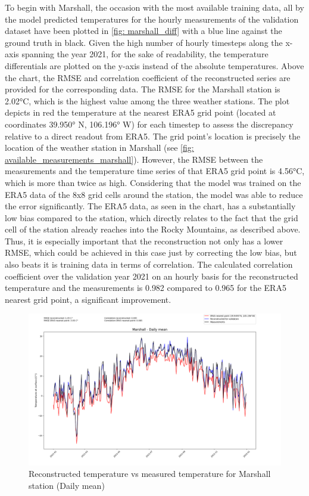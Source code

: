 To begin with Marshall, the occasion with the most available training data, all by the model predicted temperatures for the hourly measurements of the validation dataset have been plotted in \autoref{fig: marshall_diff} with a blue line against the ground truth in black.
Given the high number of hourly timesteps along the x-axis spanning the year 2021, for the sake of readability, the temperature differentials are plotted on the y-axis instead of the absolute temperatures.
Above the chart, the RMSE and correlation coefficient of the reconstructed series are provided for the corresponding data.
The RMSE for the Marshall station is 2.02°C, which is the highest value among the three weather stations.
The plot depicts in red the temperature at the nearest ERA5 grid point (located at coordinates 39.950° N, 106.196° W) for each timestep to assess the discrepancy relative to a direct readout from ERA5.
The grid point's location is precisely the location of the weather station in Marshall (see \autoref{fig: available_measurements_marshall}).
However, the RMSE between the measurements and the temperature time series of that ERA5 grid point is 4.56°C, which is more than twice as high.
Considering that the model was trained on the ERA5 data of the 8x8 grid cells around the station, the model was able to reduce the error significantly.
The ERA5 data, as seen in the chart, has a substantially low bias compared to the station, which directly relates to the fact that the grid cell of the station already reaches into the Rocky Mountains, as described above.
Thus, it is especially important that the reconstruction not only has a lower RMSE, which could be achieved in this case just by correcting the low bias, but also beats it is training data in terms of correlation.
The calculated correlation coefficient over the validation year 2021 on an hourly basis for the reconstructed temperature and the measurements is 0.982 compared to 0.965 for the ERA5 nearest grid point, a significant improvement.

\begin{figure}
    \centering
    \includegraphics[width=1.00\textwidth]{resources/images/charts/marshall_eval_grib_final/Marshall - Daily mean.png}
    \caption{Reconstructed temperature vs measured temperature for Marshall station (Daily mean)}
    \label{fig: marshall_daily}
\end{figure}

